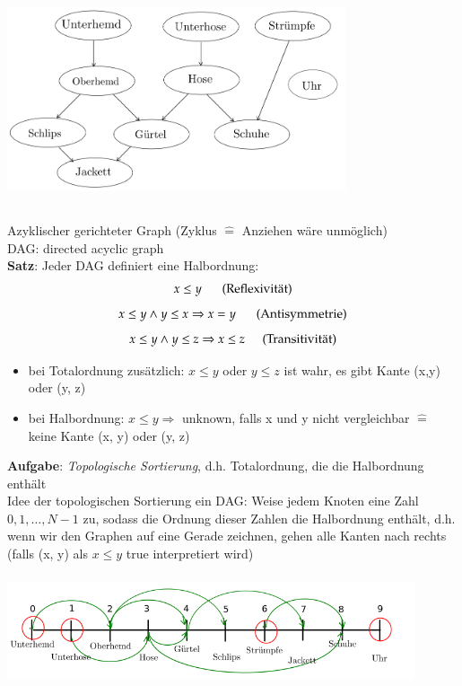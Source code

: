 \documentclass[11pt, fleqn]{scrreprt}
\begin{document}
	\includegraphics[width=10cm,height=7cm,keepaspectratio]{./Pictures/Anziehen.png}\\
	Azyklischer gerichteter Graph (Zyklus $\widehat{=}$ Anziehen wäre unmöglich) \\
	DAG: directed acyclic graph\\
	
	\textbf{Satz}: Jeder DAG definiert eine Halbordnung:
	\[ x \leq y \hspace*{5mm}\text{ (Reflexivität)}\]
	\[ x \leq y \land y \leq x \Rightarrow x = y\hspace*{5mm} \text{ (Antisymmetrie)}\]
	\[ x \leq y \land y \leq z \Rightarrow x \leq z \hspace*{5mm} \text{(Transitivität)}\]
	
	\begin{itemize}[label={}]
		\item bei Totalordnung zusätzlich: $x\leq y$ oder $y \leq z$ ist wahr, es gibt Kante (x,y) oder (y, z)
		\item 	bei Halbordnung: $x \leq y \Rightarrow$ \glqq unknown\grqq , falls x und y nicht vergleichbar $\widehat{=}$ keine Kante (x, y) oder (y, z)
	\end{itemize}
	

	
	\textbf{Aufgabe}: \emph{Topologische Sortierung}, d.h. Totalordnung, die die Halbordnung enthält\\
	
	Idee der topologischen Sortierung ein DAG: Weise jedem Knoten eine Zahl $0, 1, \dots, N-1$ zu, sodass die Ordnung dieser Zahlen die Halbordnung enthält, d.h. wenn wir den Graphen auf eine Gerade zeichnen, gehen alle Kanten nach rechts (falls (x, y) als $x \leq y$ true interpretiert wird)\\
	
	\includegraphics[width=12cm,height=4cm,keepaspectratio]{./Pictures/Zeitstrahl.png}\\
	
\end{document}
